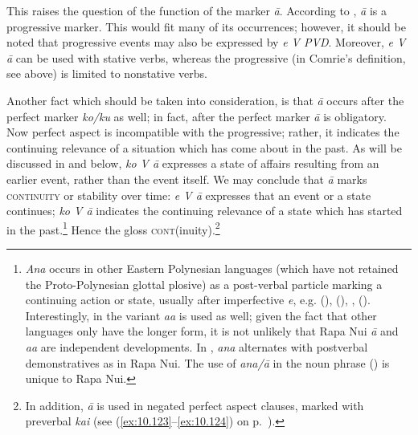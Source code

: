 This raises the question of the function of the marker \textit{{\ꞌ}ā}. According to \citet[52]{WeberR2003}, \textit{{\ꞌ}ā} is a progressive marker. This would fit many of its occurrences; however, it should be noted that progressive events may also be expressed by \textit{e V PVD}. Moreover, \textit{e V {\ꞌ}ā} can be used with stative verbs, whereas the progressive (in Comrie’s definition, see  above) is limited to nonstative verbs. 

Another fact which should be taken into consideration, is that \textit{{\ꞌ}ā} occurs after the perfect marker \textit{ko/ku} as well; in fact, after the perfect marker \textit{{\ꞌ}ā} is obligatory. Now perfect aspect is incompatible with the progressive; rather, it indicates the continuing relevance of a situation which has come about in the past. As will be discussed in  and  below, \textit{ko V {\ꞌ}ā} expresses a state of affairs resulting from an earlier event, rather than the event itself. We may conclude that \textit{{\ꞌ}ā} marks \textsc{continuity} or stability over time: \textit{e V {\ꞌ}ā} expresses that an event or a state continues; \textit{ko V {\ꞌ}ā} indicates the continuing relevance of a state which has started in the past.\footnote{\label{fn:328}\textit{Ana} occurs in other Eastern Polynesian languages (which have not retained the Proto-Polynesian glottal plosive) as a post-verbal particle marking a continuing action or state, usually after imperfective \textit{e}, e.g.  (\citealt[57–60]{ElbertPukui1979}),  (\citealt[67]{MutuTeìkitutoua2002}),  \citep[32]{Janeau1908},  (\citealt[416–419]{Bauer1993}). Interestingly, in  the variant \textit{aa} is used as well; given the fact that other languages only have the longer form, it is not unlikely that Rapa Nui \textit{{\ꞌ}ā} and  \textit{aa} are independent developments. In , \textit{ana} alternates with postverbal demonstratives as in Rapa Nui.
The use of \textit{{\ꞌ}ana/{\ꞌ}ā} in the noun phrase () is unique to Rapa Nui.} Hence the gloss \textsc{cont}(inuity).\footnote{\label{fn:329}In addition, \textit{{\ꞌ}ā} is used in negated perfect aspect clauses, marked with preverbal \textit{kai} (see (\ref{ex:10.123}–\ref{ex:10.124}) on p.~\pageref{ex:10.123}).} 

